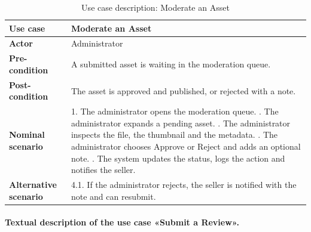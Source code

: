 \begin{table}[H]
\centering
\caption{Use case description: Moderate an Asset}
\label{tab:uc_moderate}
\renewcommand{\arraystretch}{1.3}
\begin{tabularx}{\textwidth}{|L{3.2cm}|X|}
\hline
\textbf{Use case} & Moderate an Asset \\
\hline
\textbf{Actor} & Administrator \\
\hline
\textbf{Pre-condition} & A submitted asset is waiting in the moderation queue. \\
\hline
\textbf{Post-condition} & The asset is approved and published, or rejected with a note. \\
\hline
\textbf{Nominal scenario} &
1. The administrator opens the moderation queue. . The administrator expands a pending asset. . The administrator inspects the file, the thumbnail and the metadata. . The administrator chooses Approve or Reject and adds an optional note. . The system updates the status, logs the action and notifies the seller. \\
\hline
\textbf{Alternative scenario} &
4.1. If the administrator rejects, the seller is notified with the note and can resubmit. \\
\hline
\end{tabularx}
\end{table}

\paragraph{Textual description of the use case «Submit a Review».}

